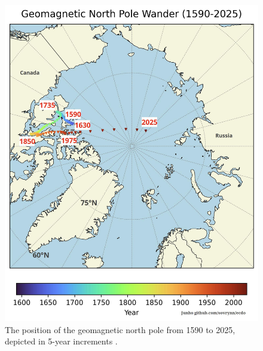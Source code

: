 \documentclass[10pt,twocolumn,letterpaper]{article}
\begin{document}
\begin{figure}[t]
\begin{center}
   \includegraphics[width=1\linewidth]{npw.jpg}
\end{center}
   \caption{The position of the geomagnetic north pole from 1590 to 2025, depicted in 5-year increments \cite{142}.}
\label{fig:13}
\label{fig:onecol}
\end{figure}
\end{document}
